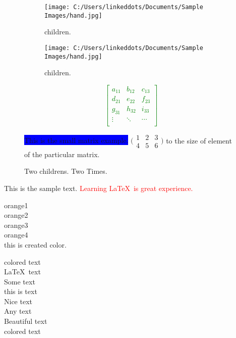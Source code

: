 \documentclass[12pt]{book}
\begin{document}
\newpage
\begin{figure}[h!]
\centering
\begin{subfigure}[b]{0.4\linewidth}
   \texttt{[image: C:/Users/linkeddots/Documents/Sample Images/hand.jpg]}
    \caption{children.}
\end{subfigure}

\begin{subfigure}[b]{0.4\linewidth}
   \texttt{[image: C:/Users/linkeddots/Documents/Sample Images/hand.jpg]}
    \caption{children.}
\end{subfigure}

\caption{Two childrens. Two Times.}
\label{fig:children}

\newpage
\textcolor{green}{\[
\begin{bmatrix}
 a_{11} & b_{12} & c_{13}\\
 d_{21} & e_{22} & f_{23}\\
 g_{31} & h_{32} & i_{33}\\
 \vdots & \ddots & \cdots\\
\end{bmatrix}
\]}

\colorbox{blue}{This is the small matrix example.} $\bigl(\begin{smallmatrix} 1 & 2 & 3\\
4 & 5 & 6
\end{smallmatrix}\bigr)$ to the size of element of \color{pink}the particular matrix.

\end{figure}
This is the sample text.
\textcolor{red} {Learning \LaTeX\ is great experience.} \\ %



\color{orange1}orange1 \\
\color{orange2}orange2 \\
\color{orange3}orange3 \\
\color{orange4}orange4 \\


\color{gowtham} this is created color.
\pagecolor{yellow}


{\color{red!50!yellow}colored text}\\ %
{\color{pink!80!yellow}\LaTeX\ text}\\  
{\color{white!60!red}Some text}\\  
{\color{blue!25!orange}this is text}\\ %
{\color{blue!55!orange}Nice text}\\  
{\color{green!70!yellow}Any text}\\  
{\color{blue!20!white!30!green}Beautiful text}\\ %
{\color{pink!40!red!50!yellow}colored text}  
  
\end{document}
